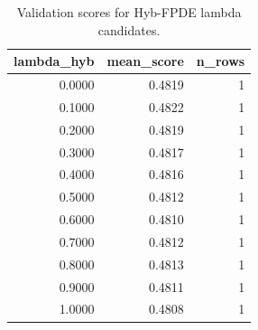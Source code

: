 \begin{table}[t]
\caption{Validation scores for Hyb-FPDE lambda candidates.}
\label{tab:lambda_distribution_computed}
\centering
\begin{tabular}{rrr}
\toprule
lambda\_hyb & mean\_score & n\_rows \\
\midrule
0.0000 & 0.4819 & 1 \\
0.1000 & 0.4822 & 1 \\
0.2000 & 0.4819 & 1 \\
0.3000 & 0.4817 & 1 \\
0.4000 & 0.4816 & 1 \\
0.5000 & 0.4812 & 1 \\
0.6000 & 0.4810 & 1 \\
0.7000 & 0.4812 & 1 \\
0.8000 & 0.4813 & 1 \\
0.9000 & 0.4811 & 1 \\
1.0000 & 0.4808 & 1 \\
\bottomrule
\end{tabular}

\end{table}
